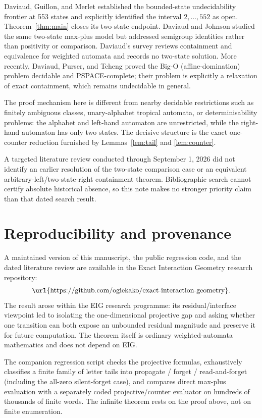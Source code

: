 \documentclass[11pt]{article}
\begin{document}
Daviaud, Guillon, and Merlet \cite{DGM2017} established the bounded-state undecidability frontier at 553 states and explicitly identified the interval $2,\ldots,552$ as open. Theorem~\ref{thm:main} closes its two-state endpoint. Daviaud and Johnson \cite{DJ2017} studied the same two-state max-plus model but addressed semigroup identities rather than positivity or comparison. Daviaud's survey \cite{Daviaud2020} reviews containment and equivalence for weighted automata and records no two-state solution. More recently, Daviaud, Purser, and Tcheng \cite{DPT2025} proved the Big-O (affine-domination) problem decidable and PSPACE-complete; their problem is explicitly a relaxation of exact containment, which remains undecidable in general.

The proof mechanism here is different from nearby decidable restrictions such as finitely ambiguous classes, unary-alphabet tropical automata, or determinisability problems: the alphabet and left-hand automaton are unrestricted, while the right-hand automaton has only two states. The decisive structure is the exact one-counter reduction furnished by Lemmas~\ref{lem:tail} and \ref{lem:counter}.

A targeted literature review conducted through September 1, 2026 did not identify an earlier resolution of the two-state comparison case or an equivalent arbitrary-left/two-state-right containment theorem. Bibliographic search cannot certify absolute historical absence, so this note makes no stronger priority claim than that dated search result.

\section{Reproducibility and provenance}

A maintained version of this manuscript, the public regression code, and the dated literature review are available in the Exact Interaction Geometry research repository:
\[
\text{\url{https://github.com/ogiekako/exact-interaction-geometry}}.
\]
The result arose within the EIG research programme: its residual/interface viewpoint led to isolating the one-dimensional projective gap and asking whether one transition can both expose an unbounded residual magnitude and preserve it for future computation. The theorem itself is ordinary weighted-automata mathematics and does not depend on EIG.

The companion regression script checks the projective formulas, exhaustively classifies a finite family of letter tails into propagate / forget / read-and-forget (including the all-zero silent-forget case), and compares direct max-plus evaluation with a separately coded projective/counter evaluator on hundreds of thousands of finite words. The infinite theorem rests on the proof above, not on finite enumeration.
\end{document}
